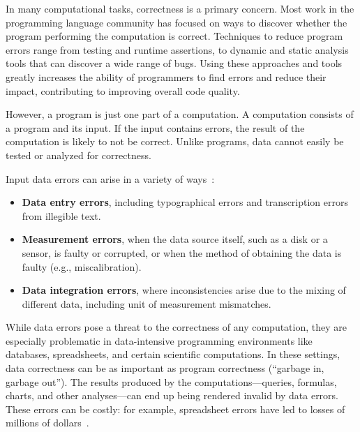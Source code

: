 In many computational tasks, correctness is a primary concern. Most
work in the programming language community has
focused on ways to discover whether the program performing the
computation is correct. Techniques to reduce program errors range from
testing and runtime assertions, to dynamic and static analysis tools
that can discover a wide range of bugs. Using these approaches and
tools greatly increases the ability of programmers to find errors and
reduce their impact, contributing to improving overall code quality.


However, a program is just one part of a computation. A computation
consists of a program and its input. If the input contains errors, the
result of the computation is likely to not be correct. Unlike
programs, data cannot easily be tested or analyzed for correctness.

Input data
errors can arise in a variety of ways~\cite{hellerstein2008quantitative}:

\begin{itemize}

\item {\bf Data entry errors}, including typographical errors and transcription errors from illegible text.

\item {\bf Measurement errors}, when the data source itself, such as a disk or a sensor, is faulty or corrupted, or when the method of obtaining the data is faulty (e.g., miscalibration).

\item {\bf Data integration errors}, where inconsistencies arise due to the mixing of different data, including unit of measurement mismatches.

\end{itemize}


While data errors pose a threat to the correctness of any computation,
they are especially problematic in data-intensive programming
environments like databases, spreadsheets, and certain scientific
computations. In these
settings, data correctness can be as important as program correctness
(``garbage in, garbage out''). The results produced by the
computations---queries, formulas, charts, and other analyses---can end
up being rendered invalid by data errors. These errors can be costly:
for example, spreadsheet errors have led to losses of millions of
dollars~\cite{DBLP:journals/corr/abs-0803-2527,sakalerrors}.

